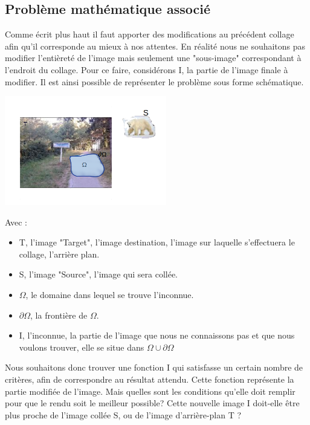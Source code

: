 \subsection{Problème mathématique associé}

Comme écrit plus haut il faut apporter des modifications au précédent collage afin qu'il corresponde au mieux à nos attentes. En réalité nous ne souhaitons pas modifier l'entièreté de l'image mais seulement une "sous-image" correspondant à l'endroit du collage. Pour ce faire, considérons I, la partie de l'image finale à modifier. Il est ainsi possible de représenter le problème sous forme schématique. 
\begin{center}
    \includegraphics[width = 200pt]{beamIm/selectedscheme.png}
\end{center}

Avec : 
\begin{itemize}
    \item T,  l'image "Target", l'image destination, l'image sur laquelle s'effectuera le collage, l'arrière plan. 
    \item S, l'image "Source", l'image qui sera collée.
    \item $\Omega$, le domaine dans lequel se trouve l'inconnue.
    \item $\partial \Omega$, la frontière de $\Omega$.
    \item I, l'inconnue, la partie de l'image que nous ne connaissons pas et que nous voulons trouver, elle se situe dans $\Omega \cup \partial \Omega$
\end{itemize}

Nous souhaitons donc trouver une fonction I qui satisfasse un certain nombre de critères, afin de correspondre au résultat attendu.  
Cette fonction représente la partie modifiée de l'image. Mais quelles sont les conditions qu'elle doit remplir pour que le rendu soit le meilleur possible? Cette nouvelle image I doit-elle être plus proche de l'image collée S, ou de l'image d'arrière-plan T ? \newline

